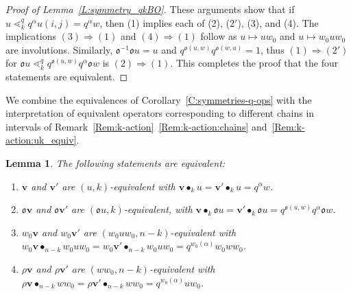 \documentclass[12pt,oneside,reqno]{amsart}
\newtheorem{lemma}[theorem]{Lemma}
\theoremstyle{definition}
\numberwithin{equation}{section}
\newcommand{\NN}{{\mathbb N}}
\newcommand{\qv}{{\mathbf v}}
\DeclareMathOperator{\kactionop}{{\scriptstyle \bullet}}
\newcommand{\kaction}[1][k]{\kactionop_{#1}}
\newcommand{\ncycle}{\mathfrak o}
\begin{document}
\begin{proof}[Proof of Lemma~\ref{L:symmetry_qkBO}]
 These arguments show that if $u\lessdot^q_k q^\alpha u(i,j)=q^\alpha w$, then (1) implies each of (2), (2$'$), (3), and (4).
 The implications  $(3)\Rightarrow(1)$ and $(4)\Rightarrow(1)$ follow as $u\mapsto u w_0$ and  $u\mapsto w_0 u w_0$ are involutions.
 Similarly, $\ncycle^{-1}\ncycle u=u$ and $q^{\ncycle(u,w)}q^{\ncycle(w,u)}=1$, thus $(1)\Rightarrow(2')$
 for $\ncycle u \lessdot^q_k q^{\ncycle(u,w)} q^\alpha\ncycle w$ is $(2)\Rightarrow(1)$.
 This completes the proof that the four statements are equivalent.
\end{proof}

We combine the equivalences of Corollary~\ref{C:symmetries-q-ops} with the interpretation of equivalent operators
corresponding to different chains in intervals of Remark~\ref{Rem:k-action}~\ref{Rem:k-action:chains}
and~\ref{Rem:k-action:uk_equiv}.

\begin{lemma}    \label{lemma:actions}
    The following statements are equivalent:
    \begin{enumerate}[label=(\alph*)]
      
    \item \label{l:actions:a}
      $\qv$ and $\qv'$ are $(u,k)$-equivalent with $\qv \kaction u = \qv' \kaction u = q^\alpha w$.
      
    \item \label{l:actions:b}
      $\ncycle \qv$ and $\ncycle \qv'$ are $(\ncycle u, k)$-equivalent, with
                     $\qv\kaction \ncycle u=\qv'\kaction \ncycle u = q^{\ncycle(u,w)} q^\alpha \ncycle w$.
    \item \label{l:actions:c}
      $w_0 \qv$ and $w_0\qv'$ are $(w_0uw_0, n{-}k)$-equivalent with
                     $w_0\qv\kactionop_{n-k} w_0uw_0=w_0\qv'\kactionop_{n-k} w_0 uw_0 = q^{w_0(\alpha)} w_0 w w_0$.
    \item \label{l:actions:d}
      $\rho \qv$ and $\rho \qv'$ are $(ww_0, n{-}k)$-equivalent with
                     $\rho\qv\kactionop_{n-k} w w_0=\rho\qv'\kactionop_{n-k} ww_0 = q^{w_0(\alpha)} u w_0$.
    \end{enumerate}
\end{lemma}
\end{document}
